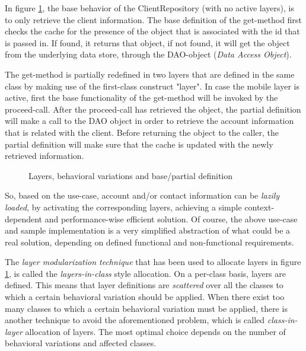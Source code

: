 \documentclass{acm_proc_article-sp}
\begin{document}
In figure \ref{fig:layers}, the base behavior of the ClientRepository (with no active layers), is to only retrieve the client information. The base definition of the get-method first checks the cache for the presence of the object that is associated with the id that is passed in. If found, it returns that object, if not found, it will get the object from the underlying data store, through the DAO-object (\textit{Data Access Object}). 

The get-method is partially redefined in two layers that are defined in the same class by making use of the first-class construct "layer". In case the mobile layer is active, first the base functionality of the get-method will be invoked by the proceed-call. After the proceed-call has retrieved the object, the partial definition will make a call to the DAO object in order to retrieve the account information that is related with the client. Before returning the object to the caller, the partial definition will make sure that the cache is updated with the newly retrieved information. 


\begin{figure}[H]
\centering
{}
\caption{Layers, behavioral variations and base/partial definition}
\label{fig:layers}
\end{figure}

So, based on the use-case, account and/or contact information can be \textit{lazily loaded}, by activating the corresponding layers, achieving a simple context-dependent and performance-wise efficient solution. Of course, the above use-case and sample implementation is a very simplified abstraction of what could be a real solution, depending on defined functional and non-functional requirements.

The \textit{layer modularization technique }that has been used to allocate layers in figure \ref{fig:layers}, is called the \textit{layers-in-class} style allocation. On a per-class basis, layers are defined. This means that layer definitions are \textit{scattered} over all the classes to which a certain behavioral variation should be applied. When there exist too many classes to which a certain behavioral variation must be applied, there is another technique to avoid the aforementioned problem, which is called \textit{class-in-layer} allocation of layers. The most optimal choice depends on the number of behavioral variations and affected classes.
\newpage
\end{document}
